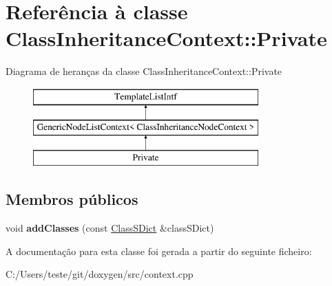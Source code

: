 \hypertarget{class_class_inheritance_context_1_1_private}{\section{Referência à classe Class\-Inheritance\-Context\-:\-:Private}
\label{class_class_inheritance_context_1_1_private}
}
Diagrama de heranças da classe Class\-Inheritance\-Context\-:\-:Private\begin{figure}[H]
\begin{center}
\leavevmode
\includegraphics[height=3.000000cm]{class_class_inheritance_context_1_1_private}
\end{center}
\end{figure}
\subsection*{Membros públicos}
\begin{DoxyCompactItemize}
\item 
\hypertarget{class_class_inheritance_context_1_1_private_af0975d15100c44d69ce3bda159f371bd}{void {\bfseries add\-Classes} (const \hyperlink{class_class_s_dict}{Class\-S\-Dict} \&class\-S\-Dict)}\label{class_class_inheritance_context_1_1_private_af0975d15100c44d69ce3bda159f371bd}

\end{DoxyCompactItemize}


A documentação para esta classe foi gerada a partir do seguinte ficheiro\-:\begin{DoxyCompactItemize}
\item 
C\-:/\-Users/teste/git/doxygen/src/context.\-cpp\end{DoxyCompactItemize}
